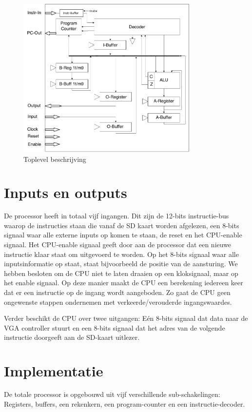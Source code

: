 \documentclass[oneside,dutch]{tudelft-report}
\begin{document}
\begin{figure}[H]
\center
\includegraphics[width=9cm]{CPU-toplevel2}
\caption{Toplevel beschrijving}
\label{CPU}
\end{figure}

\section{Inputs en outputs}
De processor heeft in totaal vijf ingangen. Dit zijn de 12-bits instructie-bus waarop de instructies staan die vanaf de SD kaart worden afgelezen, een 8-bits signaal waar alle externe inputs op komen te staan, de reset en het CPU-enable signaal. Het CPU-enable signaal geeft door aan de processor dat een nieuwe instructie klaar staat om uitgevoerd te worden. Op het 8-bits signaal waar alle inputsinformatie op staat, staat bijvoorbeeld de positie van de aansturing.
We hebben besloten om de CPU niet te laten draaien op een kloksignaal, maar op het enable signaal. Op deze manier maakt de CPU een berekening iedereen keer dat er een instructie op de ingang wordt aangeboden. Zo gaat de CPU geen ongewenste stappen ondernemen met verkeerde/verouderde ingangswaardes. 

Verder beschikt de CPU over twee uitgangen: Eén 8-bits signaal dat data naar de VGA controller stuurt en een 8-bits signaal dat het adres van de volgende instructie doorgeeft aan de SD-kaart uitlezer. 

\section{Implementatie}
De totale processor is opgebouwd uit vijf verschillende sub-schakelingen: Registers, buffers, een rekenkern, een program-counter en een instructie-decoder.
\end{document}
